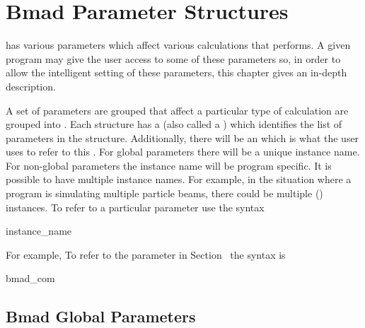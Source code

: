 \chapter{Bmad Parameter Structures}

\bmad has various parameters which affect various
calculations that \bmad performs. A given program may give the user
access to some of these parameters so, in order to allow the intelligent
setting of these parameters, this chapter gives an in-depth description.

A set of parameters are grouped that affect a particular type
of calculation are grouped into . Each structure
has a  (also called a ) which identifies
the list of parameters in the structure. 
Additionally, there will be an
 which is what the user uses to refer to this
. For global parameters there will be a unique instance name.
For non-global parameters the instance name will be program specific. 
It is possible to have multiple instance names. For example, in the situation
where a program is simulating multiple particle beams, there could be
multiple  () instances. 
To refer to a particular parameter use the syntax
\begin{example}
  instance_name%
\end{example}
For example, To refer to the  parameter in
Section~ the syntax is
\begin{example}
  bmad_com%
\end{example}

\section{Bmad Global Parameters}
\label{s:bmad.params}

